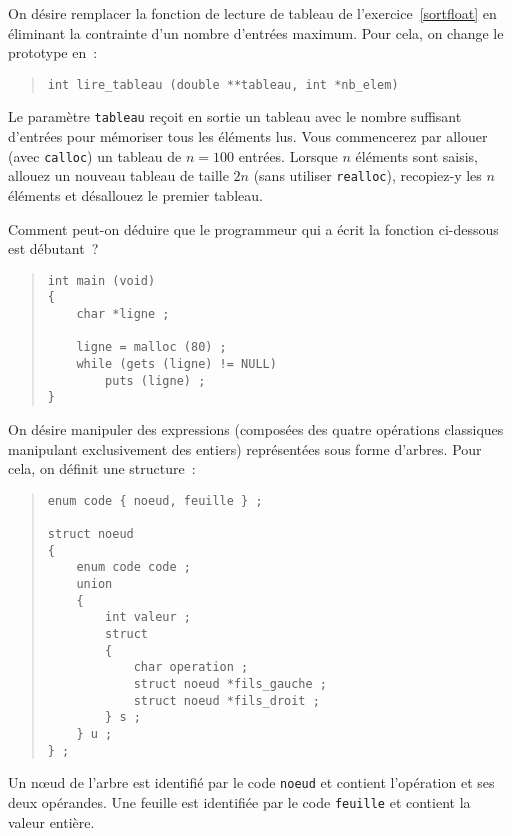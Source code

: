 \question

On désire remplacer la fonction de lecture de tableau de
l'exercice~\ref {sortfloat} en éliminant la contrainte d'un nombre
d'entrées maximum. Pour cela, on change le prototype en~:

\begin {quote}
    \verb|int lire_tableau (double **tableau, int *nb_elem)|
\end {quote}

Le paramètre {\tt tableau} reçoit en sortie un tableau avec le nombre
suffisant d'entrées pour mémoriser tous les éléments lus.  Vous
commencerez par allouer (avec {\tt calloc}) un tableau de $n = 100$
entrées.  Lorsque $n$ éléments sont saisis, allouez un nouveau tableau
de taille $2n$ (sans utiliser {\tt realloc}), recopiez-y les $n$
éléments et désallouez le premier tableau.


\question

Comment peut-on déduire que le programmeur qui a écrit la fonction
ci-dessous est débutant~?

\begin {quote}
\small
\begin {verbatim}
int main (void)
{
    char *ligne ;

    ligne = malloc (80) ;
    while (gets (ligne) != NULL)
        puts (ligne) ;
}
\end{verbatim}
\end {quote}



\question
    \label {arbre}

On désire manipuler des expressions (composées des quatre opérations
classiques manipulant exclusivement des entiers) représentées sous forme
d'arbres.  Pour cela, on définit une structure~:

\begin {quote}
\small
\begin {verbatim}
enum code { noeud, feuille } ;

struct noeud
{
    enum code code ;
    union
    {
        int valeur ;
        struct
        {
            char operation ;
            struct noeud *fils_gauche ;
            struct noeud *fils_droit ;
        } s ;
    } u ;
} ;
\end{verbatim}
\end {quote}

Un n{\oe}ud de l'arbre est identifié par le code {\tt noeud} et contient
l'opération et ses deux opérandes.  Une feuille est identifiée par le
code {\tt feuille} et contient la valeur entière.


